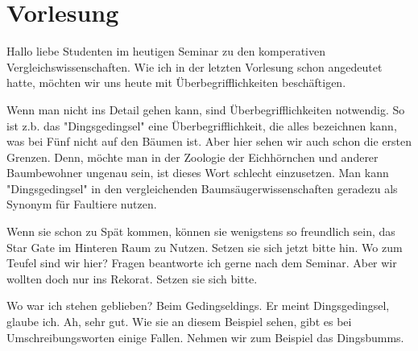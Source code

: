 \newpage
\section{Vorlesung}
\label{sec:vorlesung}
\charaktere{\Sum, \Gimli, \Prof, \Studa, \Studb, \Studc}
\hauptbeamer{-}
\sound{-}

\begin{verseplay}[7em]
\s{\Prof} Hallo liebe Studenten im heutigen Seminar zu den komperativen Vergleichswissenschaften. Wie ich in der letzten Vorlesung schon angedeutet hatte, möchten wir uns heute mit Überbegrifflichkeiten beschäftigen.
\end{verseplay}

\begin{verseplay}[7em]
 \s{\Prof} Wenn man nicht ins Detail gehen kann, sind Überbegrifflichkeiten notwendig. So ist z.b. das "Dingsgedingsel" eine Überbegrifflichkeit, die alles bezeichnen kann, was bei Fünf nicht auf den Bäumen ist. Aber hier sehen wir auch schon die ersten Grenzen. Denn, möchte man in der Zoologie der Eichhörnchen und anderer Baumbewohner ungenau sein, ist dieses Wort schlecht einzusetzen. Man kann "Dingsgedingsel" in den vergleichenden Baumsäugerwissenschaften geradezu als Synonym für Faultiere nutzen.
\end{verseplay}
\begin{verseplay}[7em]
\s\Prof Wenn sie schon zu Spät kommen, können sie wenigstens so freundlich sein, das Star Gate im Hinteren Raum zu Nutzen. Setzen sie sich jetzt bitte hin.
\s\Gimli {} Wo zum Teufel sind wir hier?
\s\Prof Fragen beantworte ich gerne nach dem Seminar.
\s\Gimli Aber wir wollten doch nur  ins Rekorat.
\s\Prof {} Setzen sie sich bitte.
\end{verseplay}

\begin{verseplay}[7em]
\s\Prof Wo war ich stehen geblieben?
\s\Studa Beim Gedingseldings.
\s\Studb Er meint Dingsgedingsel, glaube ich.
\s\Prof Ah, sehr gut. Wie sie an diesem Beispiel sehen, gibt es bei Umschreibungsworten einige Fallen. Nehmen wir zum Beispiel das Dingsbumms.
\end{verseplay}


